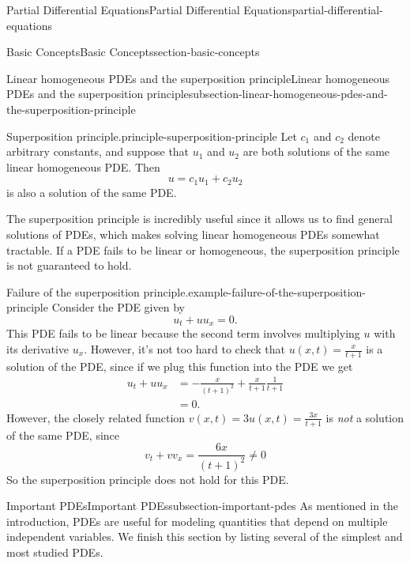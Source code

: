 \documentclass[oneside,10pt,]{book}
\numberwithin{equation}{section}
\newcommand{\amp}{&}
\begin{document}
\begin{chapterptx}{Partial Differential Equations}{}{Partial Differential Equations}{}{}{partial-differential-equations}
\begin{sectionptx}{Basic Concepts}{}{Basic Concepts}{}{}{section-basic-concepts}
\begin{subsectionptx}{Linear homogeneous PDEs and the superposition principle}{}{Linear homogeneous PDEs and the superposition principle}{}{}{subsection-linear-homogeneous-pdes-and-the-superposition-principle}
\begin{principle}{Superposition principle.}{}{principle-superposition-principle}%
\hypertarget{p-640}{}%
Let \(c_{1}\) and \(c_{2}\) denote arbitrary constants, and suppose that \(u_{1}\) and \(u_{2}\) are both solutions of the same linear homogeneous PDE. Then%
\begin{equation*}
u = c_{1}u_{1}+c_{2}u_{2}
\end{equation*}
is also a solution of the same PDE.%
\end{principle}
\hypertarget{p-641}{}%
The superposition principle is incredibly useful since it allows us to find general solutions of PDEs, which makes solving linear homogeneous PDEs somewhat tractable. If a PDE fails to be linear or homogeneous, the superposition principle is not guaranteed to hold.%
\begin{example}{Failure of the superposition principle.}{example-failure-of-the-superposition-principle}%
\hypertarget{p-642}{}%
Consider the PDE given by%
\begin{equation*}
u_{t}+uu_{x} = 0.
\end{equation*}
This PDE fails to be linear because the second term involves multiplying \(u\) with its derivative \(u_{x}\). However, it's not too hard to check that \(u(x,t) = \frac{x}{t+1}\) is a solution of the PDE, since if we plug this function into the PDE we get%
\begin{align*}
u_{t} + uu_{x} \amp = -\frac{x}{(t+1)^{2}} + \frac{x}{t+1}\frac{1}{t+1} \\
\amp = 0 \text{.}
\end{align*}
However, the closely related function \(v(x,t) = 3u(x,t) = \frac{3x}{t+1}\) is \emph{not} a solution of the same PDE, since%
\begin{equation*}
v_{t}+vv_{x} = \frac{6x}{(t+1)^{2}}\neq0
\end{equation*}
So the superposition principle does not hold for this PDE.%
\end{example}
\end{subsectionptx}
%
%
\typeout{************************************************}
\typeout{************************************************}
%
\begin{subsectionptx}{Important PDEs}{}{Important PDEs}{}{}{subsection-important-pdes}
\hypertarget{p-643}{}%
As mentioned in the introduction, PDEs are useful for modeling quantities that depend on multiple independent variables. We finish this section by listing several of the simplest and most studied PDEs.%

\end{subsectionptx}
\end{sectionptx}
\end{chapterptx}
\end{document}
